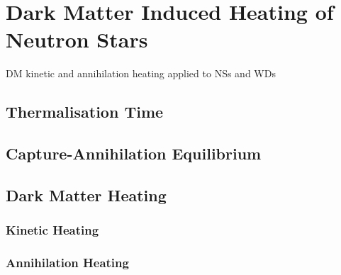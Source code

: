 \graphicspath{{img/chapter_5/}}

\chapter{Dark Matter Induced Heating of Neutron Stars }
\label{chapter:heating}

\begin{synopsis}
  DM kinetic and annihilation heating applied to NSs and WDs
\end{synopsis}

  \section{Thermalisation Time}


  \section{Capture-Annihilation Equilibrium}
  
  \section{Dark Matter Heating}

  \subsection{Kinetic Heating}

  \subsection{Annihilation Heating}

  